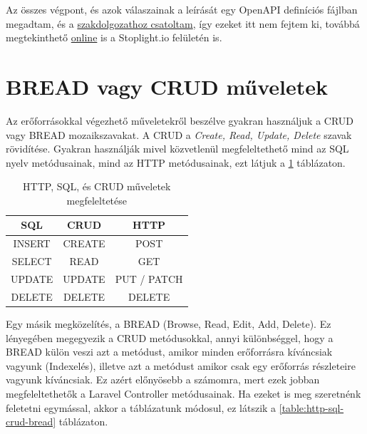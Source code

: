 \documentclass[a4paper,12pt]{thesis-ekf}
\theoremstyle{definition}
\begin{document}
		Az összes végpont, és azok válaszainak a leírását egy OpenAPI definíciós fájlban megadtam, és a  \href{https://github.com/dombidav/hl5u4v-thesis/blob/main/docs/openapi.json}{szakdolgozathoz csatoltam}\cite{open-api}, így ezeket itt nem fejtem ki, továbbá megtekinthető \href{https://hl5u4v-thesis.stoplight.io/docs/hl5u4v-thesis/branches/main/}{online} is a Stoplight.io felületén is\cite{stoplight}.
		
		\section{BREAD vagy CRUD műveletek}\label{sc-bread}
			Az erőforrásokkal végezhető műveletekről beszélve gyakran használjuk a CRUD vagy BREAD mozaikszavakat. A CRUD a \emph{Create, Read, Update, Delete} szavak rövidítése. Gyakran használják mivel közvetlenül megfeleltethető mind az SQL nyelv metódusainak, mind az HTTP metódusainak, ezt látjuk a \ref{table:http-sql-crud} táblázaton.
			
			\begin{table}[h!]
				\centering
				\begin{tabular}{|c | c | c|}
					\hline
					\multicolumn{1}{|c|}{\textbf{SQL}} & \textbf{CRUD} & \textbf{HTTP} \\ \hline
					INSERT & CREATE & POST \\ \hline
					SELECT & READ & GET \\ \hline
					UPDATE & UPDATE & PUT / PATCH \\ \hline
					DELETE & DELETE & DELETE \\ \hline
				\end{tabular}
				\caption{HTTP, SQL, és CRUD műveletek megfeleltetése}
				\label{table:http-sql-crud}
			\end{table}
		
			Egy másik megközelítés, a BREAD (Browse, Read, Edit, Add, Delete). Ez lényegében megegyezik a CRUD metódusokkal, annyi különbséggel, hogy a BREAD külön veszi azt a metódust, amikor minden erőforrásra kíváncsiak vagyunk (Indexelés), illetve azt a metódust amikor csak egy erőforrás részleteire vagyunk kíváncsiak. Ez azért előnyösebb a számomra, mert ezek jobban megfeleltethetők a Laravel Controller metódusainak. Ha ezeket is meg szeretnénk feletetni egymással, akkor a táblázatunk módosul\cite{bread}, ez látszik a \ref{table:http-sql-crud-bread} táblázaton.
 	
\end{document}
